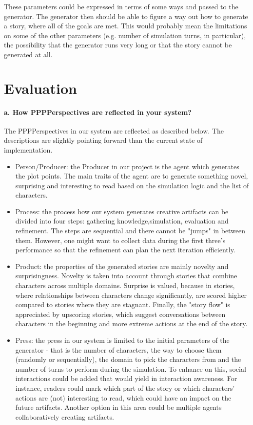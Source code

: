 \documentclass[english]{tktltiki}
\begin{document}
    These parameters could be expressed in terms of some ways and passed to the generator. The generator then should be able to figure a way out how to generate a story, where all of the goals are met. This would probably mean the limitations on some of the other parameters (e.g. number of simulation turns, in particular), the possibility that the generator runs very long or that the story cannot be generated at all.

    \pagebreak
    \section{Evaluation}
    
    \paragraph{a. How PPPPerspectives are reflected in your system?}
    The PPPPerspectives in our system are reflected as described below. The descriptions are slightly pointing forward than the current state of implementation.

    \begin{itemize}
        \item Person/Producer: the Producer in our project is the agent which generates the plot points. The main traits of the agent are to generate something novel, surprising and interesting to read based on the simulation logic and the list of characters. 
        \item Process: the process how our system generates creative artifacts can be divided into four steps: gathering knowledge,simulation, evaluation and refinement. The steps are sequential and there cannot be "jumps" in between them. However, one might want to collect data during the first three's performance so that the refinement can plan the next iteration efficiently. 
        \item Product: the properties of the generated stories are mainly novelty and surprisingness. Novelty is taken into account through stories that combine characters across multiple domains. Surprise is valued, because in stories, where relationships between characters change significantly, are scored higher compared to stories where they are stagnant. Finally, the "story flow" is appreciated by upscoring stories, which suggest conversations between characters in the beginning and more extreme actions at the end of the story.
        \item Press: the press in our system is limited to the initial parameters of the generator - that is the number of characters, the way to choose them (randomly or sequentially), the domain to pick the characters from and the number of turns to perform during the simulation. To enhance on this, social interactions could be added that would yield in interaction awareness. For instance, readers could mark which part of the story or which characters' actions are (not) interesting to read, which could have an impact on the future artifacts. Another option in this area could be multiple agents collaboratively creating artifacts. 
    \end{itemize}
    
\end{document}
